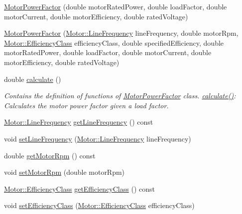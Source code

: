 \begin{DoxyCompactItemize}
\item 
\hyperlink{class_motor_power_factor_a1a2509240f0f759952debf47b7ef3a14}{Motor\+Power\+Factor} (double motor\+Rated\+Power, double load\+Factor, double motor\+Current, double motor\+Efficiency, double rated\+Voltage)
\item 
\hyperlink{class_motor_power_factor_ab48906ae429e7c6f05cebaed14fe2ca1}{Motor\+Power\+Factor} (\hyperlink{class_motor_acee1bdf1b684ad36cb80dc2829d9fcee}{Motor\+::\+Line\+Frequency} line\+Frequency, double motor\+Rpm, \hyperlink{class_motor_afa022971ae062406a9f588c601673d4e}{Motor\+::\+Efficiency\+Class} efficiency\+Class, double specified\+Efficiency, double motor\+Rated\+Power, double load\+Factor, double motor\+Current, double motor\+Efficiency, double rated\+Voltage)
\item 
double \hyperlink{class_motor_power_factor_ac9d5742db4a371bc4e15d5b29d335b6e}{calculate} ()
\begin{DoxyCompactList}\small\item\em Contains the definition of functions of \hyperlink{class_motor_power_factor}{Motor\+Power\+Factor} class. \hyperlink{class_motor_power_factor_ac9d5742db4a371bc4e15d5b29d335b6e}{calculate()}\+: Calculates the motor power factor given a load factor. \end{DoxyCompactList}\item 
\hyperlink{class_motor_acee1bdf1b684ad36cb80dc2829d9fcee}{Motor\+::\+Line\+Frequency} \hyperlink{class_motor_power_factor_aa4cdc420b1f611bcb9f4a69c69c1fabf}{get\+Line\+Frequency} () const
\item 
void \hyperlink{class_motor_power_factor_a5186ccae4191cfc5b2b7c3bdbd166563}{set\+Line\+Frequency} (\hyperlink{class_motor_acee1bdf1b684ad36cb80dc2829d9fcee}{Motor\+::\+Line\+Frequency} line\+Frequency)
\item 
double \hyperlink{class_motor_power_factor_acc7e144fc6c05446141cb0e07be03d70}{get\+Motor\+Rpm} () const
\item 
void \hyperlink{class_motor_power_factor_a4154bf52c6c9c9e5fb2f0985d7ae3531}{set\+Motor\+Rpm} (double motor\+Rpm)
\item 
\hyperlink{class_motor_afa022971ae062406a9f588c601673d4e}{Motor\+::\+Efficiency\+Class} \hyperlink{class_motor_power_factor_a1ce98cb6ae9fbf09b05b4b6bd75e5c71}{get\+Efficiency\+Class} () const
\item 
void \hyperlink{class_motor_power_factor_add3125243d7f11131abc4e1d172ffdfc}{set\+Efficiency\+Class} (\hyperlink{class_motor_afa022971ae062406a9f588c601673d4e}{Motor\+::\+Efficiency\+Class} efficiency\+Class)
\end{DoxyCompactItemize}



